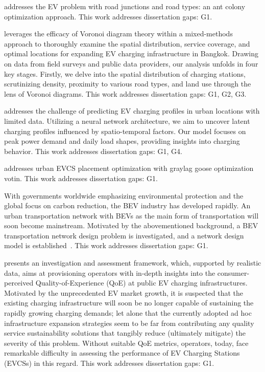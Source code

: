 \documentclass[letterpaper, 12pt, oneside, doublespacing]{Thesis}
\begin{document}
\noindent \cite{the_electric_2024} addresses the EV problem with road junctions and road types: an ant colony optimization approach. This work addresses dissertation gaps: G1.



\noindent \cite{towards_sustainable_2024} leverages the efficacy of Voronoi diagram theory within a mixed-methods approach to thoroughly examine the spatial distribution, service coverage, and optimal locations for expanding EV charging infrastructure in Bangkok. Drawing on data from field surveys and public data providers, our analysis unfolds in four key stages. Firstly, we delve into the spatial distribution of charging stations, scrutinizing density, proximity to various road types, and land use through the lens of Voronoi diagrams. This work addresses dissertation gaps: G1, G2, G3.



\noindent \cite{towards_using_2024} addresses the challenge of predicting EV charging profiles in urban locations with limited data. Utilizing a neural network architecture, we aim to uncover latent charging profiles influenced by spatio-temporal factors. Our model focuses on peak power demand and daily load shapes, providing insights into charging behavior. This work addresses dissertation gaps: G1, G4.



\noindent \cite{urban_electric_2024} addresses urban EVCS placement optimization with graylag goose optimization votin. This work addresses dissertation gaps: G1.



\noindent With governments worldwide emphasizing environmental protection and the global focus on carbon reduction, the BEV industry has developed rapidly. An urban transportation network with BEVs as the main form of transportation will soon become mainstream. Motivated by the abovementioned background, a BEV transportation network design problem is investigated, and a network design model is established~\cite{a_battery_2023}. This work addresses dissertation gaps: G1.



\noindent \cite{a_data-driven_2023} presents an investigation and assessment framework, which, supported by realistic data, aims at provisioning operators with in-depth insights into the consumer-perceived Quality-of-Experience (QoE) at public EV charging infrastructures. Motivated by the unprecedented EV market growth, it is suspected that the existing charging infrastructure will soon be no longer capable of sustaining the rapidly growing charging demands; let alone that the currently adopted ad hoc infrastructure expansion strategies seem to be far from contributing any quality service sustainability solutions that tangibly reduce (ultimately mitigate) the severity of this problem. Without suitable QoE metrics, operators, today, face remarkable difficulty in assessing the performance of EV Charging Stations (EVCSs) in this regard. This work addresses dissertation gaps: G1.
\end{document}

